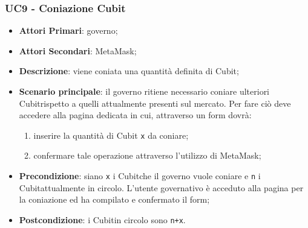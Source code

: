 \subsubsection{UC9 - Coniazione Cubit}
\begin{itemize}
	\item \textbf{Attori Primari}: governo;
	\item \textbf{Attori Secondari}: MetaMask\glo;
	\item \textbf{Descrizione}: viene coniata una quantità definita di Cubit\glo;
	
	\item \textbf{Scenario principale}: il governo ritiene necessario coniare ulteriori Cubit\glosp rispetto a quelli attualmente presenti sul mercato. Per fare ciò deve accedere alla pagina dedicata in cui, attraverso un form dovrà:
	 \begin{enumerate}[label=\alph*.]
		\item inserire la quantità di Cubit \texttt{x} da coniare;
		\item confermare tale operazione attraverso l'utilizzo di MetaMask\glo;
	\end{enumerate}
	\item \textbf{Precondizione}: siano \texttt{x} i Cubit\glosp che il governo vuole coniare e \texttt{n} i Cubit\glosp attualmente in circolo. L'utente governativo è acceduto alla pagina per la coniazione ed ha compilato e confermato il form;
	\item \textbf{Postcondizione}: i Cubit\glosp in circolo sono \texttt{n+x}.
\end{itemize}

